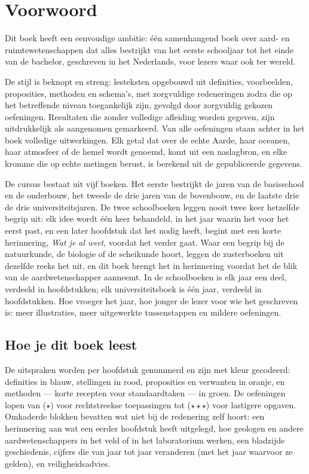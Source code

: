 \chapter{Voorwoord}

Dit boek heeft een eenvoudige ambitie: één samenhangend boek over aard- en
ruimtewetenschappen dat alles bestrijkt van het eerste schooljaar tot het
einde van de bachelor, geschreven in het Nederlands, voor lezers waar ook
ter wereld.

De stijl is beknopt en streng: lesteksten opgebouwd uit definities,
voorbeelden, proposities, methoden en schema's, met zorgvuldige
redeneringen zodra die op het betreffende niveau toegankelijk zijn,
gevolgd door zorgvuldig gekozen oefeningen. Resultaten die zonder
volledige afleiding worden gegeven, zijn uitdrukkelijk als aangenomen
gemarkeerd. Van alle oefeningen staan achter in het boek volledige
uitwerkingen. Elk getal dat over de echte Aarde, haar oceanen, haar
atmosfeer of de hemel wordt genoemd, komt uit een naslagbron, en elke
kromme die op echte metingen berust, is berekend uit de gepubliceerde
gegevens.

De cursus bestaat uit vijf boeken. Het eerste bestrijkt de jaren van de
basisschool en de onderbouw, het tweede de drie jaren van de bovenbouw, en
de laatste drie de drie universiteitsjaren. De twee schoolboeken leggen
nooit twee keer hetzelfde begrip uit: elk idee wordt één keer behandeld,
in het jaar waarin het voor het eerst past, en een later hoofdstuk dat het
nodig heeft, begint met een korte herinnering, \emph{Wat je al weet},
voordat het verder gaat. Waar een begrip bij de natuurkunde, de biologie of
de scheikunde hoort, leggen de zusterboeken uit dezelfde reeks het uit, en
dit boek brengt het in herinnering voordat het de blik van de
aardwetenschapper aanneemt. In de schoolboeken is elk jaar een deel,
verdeeld in hoofdstukken; elk universiteitsboek is één jaar, verdeeld in
hoofdstukken. Hoe vroeger het jaar, hoe jonger de lezer voor wie het
geschreven is: meer illustraties, meer uitgewerkte tussenstappen en
mildere oefeningen.

\section*{Hoe je dit boek leest}

De uitspraken worden per hoofdstuk genummerd en zijn met kleur gecodeerd:
definities in blauw, stellingen in rood, proposities en verwanten in
oranje, en methoden --- korte recepten voor standaardtaken --- in groen.
De oefeningen lopen van ($\star$) voor rechtstreekse toepassingen tot
($\star\star\star$) voor lastigere opgaven. Omkaderde blokken bevatten
wat niet bij de redenering zelf hoort: een herinnering aan wat een eerder
hoofdstuk heeft uitgelegd, hoe geologen en andere aardwetenschappers in het
veld of in het laboratorium werken, een bladzijde geschiedenis, cijfers die
van jaar tot jaar veranderen (met het jaar waarvoor ze gelden), en
veiligheidsadvies.

